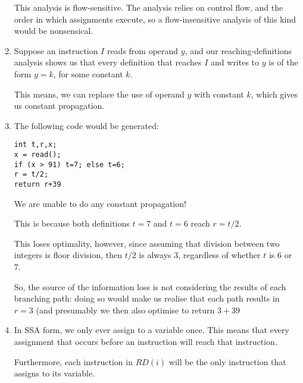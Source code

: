 \begin{enumerate}[label=(\alph*)]
    This analysis is flow-sensitive. The analysis relies on control flow, and the order in which assignments execute, so a flow-insensitive analysis of this kind would be nonsensical.

\item
    Suppose an instruction $I$ reads from operand $y$, and our reaching-definitions analysis shows us that every definition that reaches $I$ and writes to $y$ is of the form $y=k$, for some constant $k$.

    This means, we can replace the use of operand $y$ with constant $k$, which gives us constant propagation.

\item

    The following code would be generated:

\begin{verbatim}
int t,r,x;
x = read();
if (x > 91) t=7; else t=6;
r = t/2;
return r+39
\end{verbatim}

We are unable to do any constant propagation!

This is because both definitions $t=7$ and $t=6$ reach $r=t / 2$.

This loses optimality, however, since assuming that division between two integers is floor division, then $t / 2$ is always 3, regardless of whether $t$ is 6 or 7.

So, the source of the information loss is not considering the results of each branching path: doing so would make us realise that each path results in $r=3$ (and presumably we then also optimise to return $3 + 39$

\item
    In SSA form, we only ever assign to a variable once. This means that every assignment that occurs before an instruction will reach that instruction.

    Furthermore, each instruction in $RD(i)$ will be the only instruction that assigns to its variable.





    
\end{enumerate}

